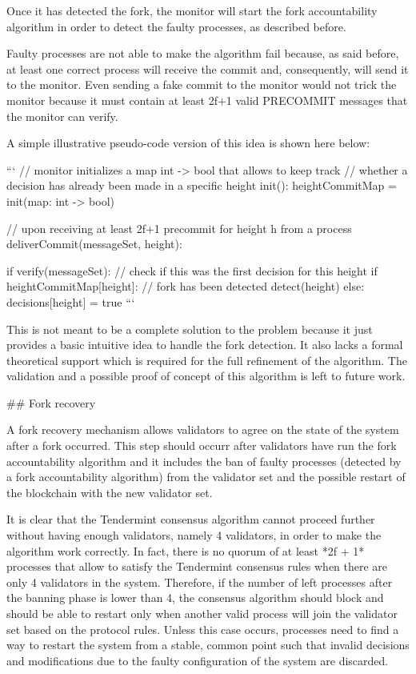 \documentclass[a4paper,11pt,oneside]{report}
\begin{document}
\begin{markdown}
Once it has detected the fork, the monitor will start the fork accountability algorithm in order to detect the faulty processes, as described before.

Faulty processes are not able to make the algorithm fail because, as said before, at least one correct process will receive the commit and, consequently, will send it to the monitor. Even sending a fake commit to the monitor would not trick the monitor because it must contain at least 2f+1 valid PRECOMMIT messages that the monitor can verify.

A simple illustrative pseudo-code version of this idea is shown here below:


    ```
    // monitor initializes a map int -> bool that allows to keep track
    // whether a decision has already been made in a specific height
    init():
	    heightCommitMap = init(map: int -> bool)

    // upon receiving at least 2f+1 precommit for height h from a process 
    deliverCommit(messageSet, height):
   
	    if verify(messageSet):
		    // check if this was the first decision for this height
		    if heightCommitMap[height]:
			    // fork has been detected
			    detect(height)
		    else:
			    decisions[height] = true
    ```

This is not meant to be a complete solution to the problem because it just provides a basic intuitive idea to handle the fork detection. It also lacks a formal theoretical support which is required for the full refinement of the algorithm.
The validation and a possible proof of concept of this algorithm is left to future work.

## Fork recovery

A fork recovery mechanism allows validators to agree on the state of the system after a fork occurred. 
This step should occurr after validators have run the fork accountability algorithm and it includes the ban of faulty processes (detected by a fork accountability algorithm) from the validator set and the possible restart of the blockchain with the new validator set.

It is clear that the Tendermint consensus algorithm cannot proceed further without having enough validators, namely 4 validators, in order to make the algorithm work correctly. In fact, there is no quorum of at least *2f + 1* processes that allow to satisfy the Tendermint consensus rules when there are only 4 validators in the system. 
Therefore, if the number of left processes after the banning phase is lower than 4, the consensus algorithm should block and should be able to restart only when another valid process will join the validator set based on the protocol rules.
Unless this case occurs, processes need to find a way to restart the system from a stable, common point such that invalid decisions and modifications due to the faulty configuration of the system are discarded.


\end{markdown}
\end{document}

